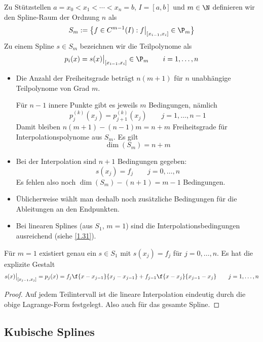 \documentclass[11pt]{scrbook}
\begin{document}
\begin{df}
	\label{1.30}
	Zu Stützstellen $a=x_0 < x_1 < \dotsb < x_n = b$, $I=[a,b]$ und $m\in \N$ definieren wir den Spline-Raum der Ordnung $n$ als
	\[
		S_m := \big\{ f\in C^{m-1}(I) : f\big|_{[x_{i-1},x_i]}\in \P_m\big\}
	\]
	Zu einem Spline $s\in S_m$ bezeichnen wir die Teilpolynome als
	\[
		p_i(x) = s(x)\big|_{[x_{i-1},x_i]} \in \P_m \qquad i=1,\dotsc,n
	\]
\end{df}

\begin{nt*}
	\begin{itemize}
		\item
			Die Anzahl der Freiheitsgrade beträgt $n(m+1)$ für $n$ unabhängige Teilpolynome von Grad $m$.

			Für $n-1$ innere Punkte gibt es jeweils $m$ Bedingungen, nämlich
			\[
				p_j^{(k)}(x_j) = p_{j+1}^{(k)}(x_j) \qquad j=1,\dotsc,n-1
			\]
			Damit bleiben $n(m+1)-(n-1)m = n+m$ Freiheitsgrade für Interpolationspolynome aus $S_m$.
			Es gilt
			\[
				\dim (S_m) = n+m
			\]
		\item
			Bei der Interpolation sind $n+1$ Bedingungen gegeben:
			\[
				s(x_j) = f_j \qquad j=0,\dotsc,n
			\]
			Es fehlen also noch $\dim (S_m) - (n+1) = m-1$ Bedingungen.
		\item
			Üblicherweise wählt man deshalb noch zusätzliche Bedingungen für die Ableitungen an den Endpunkten.
		\item
			Bei linearen Splines (aus $S_1$, $m=1$) sind die Interpolationsbedingungen ausreichend (siehe \ref{1.31}).
	\end{itemize}
\end{nt*}

\begin{st}
	\label{1.31}
	Für $m=1$ existiert genau ein $s\in S_1$ mit $s(x_j) = f_j$ für $j=0,\dotsc,n$.
	Es hat die explizite Gestalt
	\[
		s(x) \big|_{[x_{j-1},x_j]} = p_j(x) = f_j \f {x-x_{j-1}}{x_j - x_{j-1}} + f_{j-1}\f {x-x_j}{x_{j-1}-x_j}
		\qquad j=1,\dotsc,n
	\]
	\begin{proof}
		Auf jedem Teilintervall ist die lineare Interpolation eindeutig durch die obige Lagrange-Form festgelegt.
		Also auch für das gesamte Spline.
	\end{proof}
\end{st}

\subsection{Kubische Splines}
\end{document}

